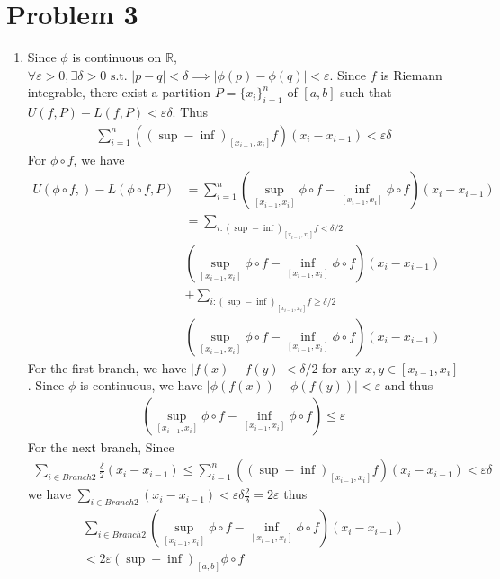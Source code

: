 \documentclass[a4paper]{report}
\def\ve{\varepsilon}
\begin{document}
\section*{Problem 3}
\begin{enumerate}[label = (\alph*)]

\item Since $\phi$ is continuous on $\mathbb{R}$, $\forall \ve > 0, \exists \delta > 0 
\text{ s.t. } |p - q| < \delta \implies |\phi(p) - \phi(q)| < \ve$. Since $f$ is Riemann
integrable, there exist a partition $P = {\{x_i\}}_{i=1}^n$ of $[a, b]$ such that $U(f, P) 
-L(f, P) < \ve\delta$. Thus 
\begin{align}
    \sum_{i=1}^n \left({(\sup - \inf)}_{[x_{i-1}, x_i]} f\right) 
    (x_i - x_{i-1}) < \ve \delta
\end{align}
For $\phi \circ f$, we have
\begin{align}
    U(\phi\circ f, ) - L(\phi \circ f, P) &= 
    \sum_{i=1}^n \left(\sup_{[x_{i-1}, x_i]}\phi\circ f - \inf_{[x_{i-1}, x_i]}
        \phi\circ f\right) (x_i - x_{i-1}) \\
        &=\sum_{i: {(\sup - \inf)}_{[x_{i-1}, x_i]} f < \delta / 2} \\
        &\left(\sup_{[x_{i-1}, x_i]}\phi\circ f - \inf_{[x_{i-1}, x_i]}
        \phi\circ f\right) (x_i - x_{i-1})\\ &+ 
        \sum_{i: {(\sup - \inf)}_{[x_{i-1}, x_i]} f \ge \delta / 2} \\
        &\left(\sup_{[x_{i-1}, x_i]}\phi\circ f - \inf_{[x_{i-1}, x_i]}
        \phi\circ f\right) (x_i - x_{i-1})
\end{align}
For the first branch, we have $|f(x) - f(y)| < \delta/2$ for any $x, y \in [x_{i-1}, x_i]$.
Since $\phi$ is continuous, we have $|\phi(f(x)) - \phi(f(y))| < \ve$ and thus 
\begin{align}
    \left(\sup_{[x_{i-1}, x_i]}\phi\circ f - \inf_{[x_{i-1}, x_i]}
        \phi\circ f\right) \le \ve
\end{align}
For the next branch, Since
\begin{align}
    \sum_{i \in Branch2} \frac{\delta}{2} (x_i - x_{i-1}) \le \sum_{i=1}^n 
    \left({(\sup - \inf)}_{[x_{i-1}, x_i]} f\right) 
    (x_i - x_{i-1}) < \ve \delta
\end{align}
we have $\sum_{i \in Branch2} (x_i - x_{i-1}) < \ve \delta \frac{2}{\delta} = 2\ve$ thus 
\begin{align*}
    \sum_{i \in Branch2} \left(\sup_{[x_{i-1}, x_i]}\phi\circ f - \inf_{[x_{i-1}, x_i]}
    \phi\circ f\right) (x_i - x_{i-1})\\ < 2\ve {(\sup-\inf)}_{[a,b]} \phi \circ f
\end{align*}


\end{enumerate}
\end{document}
